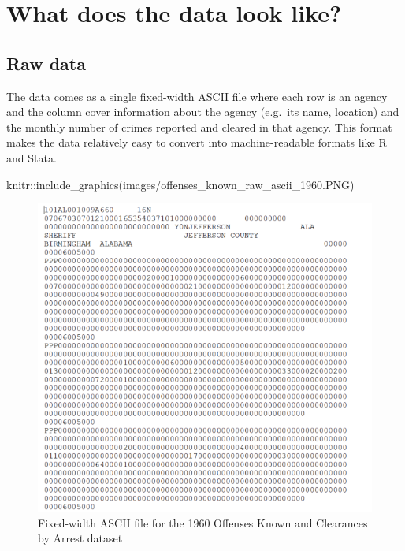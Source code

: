\documentclass[
  12pt,
  openany]{book}
\newenvironment{Shaded}{\begin{snugshade}}{\end{snugshade}}
\newcommand{\FunctionTok}[1]{\textcolor[rgb]{0,0,0}{#1}}
\newcommand{\NormalTok}[1]{#1}
\newcommand{\SpecialCharTok}[1]{\textcolor[rgb]{0,0,0}{#1}}
\newcommand{\StringTok}[1]{\textcolor[rgb]{0.5,0.5,0.5}{#1}}
\begin{document}
\hypertarget{what-does-the-data-look-like}{%
\section{What does the data look like?}\label{what-does-the-data-look-like}}

\hypertarget{raw-data}{%
\subsection{Raw data}\label{raw-data}}

The data comes as a single fixed-width ASCII file where each row is an agency and the column cover information about the agency (e.g.~its name, location) and the monthly number of crimes reported and cleared in that agency. This format makes the data relatively easy to convert into machine-readable formats like R and Stata.

\begin{Shaded}
\begin{Highlighting}[]
\NormalTok{knitr}\SpecialCharTok{::}\FunctionTok{include\_graphics}\NormalTok{(}\StringTok{\textquotesingle{}images/offenses\_known\_raw\_ascii\_1960.PNG\textquotesingle{}}\NormalTok{)}
\end{Highlighting}
\end{Shaded}

\begin{figure}
\includegraphics[width=8.75in]{images/offenses_known_raw_ascii_1960} \caption{Fixed-width ASCII file for the 1960 Offenses Known and Clearances by Arrest dataset}\label{fig:unnamed-chunk-1}
\end{figure}
\end{document}
